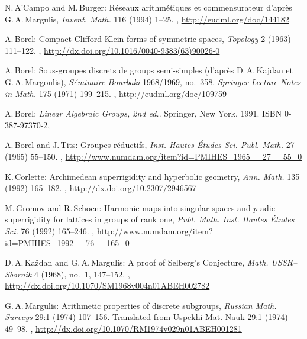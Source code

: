 \begin{references}{99}

 N.\,A'Campo and M.\,Burger:
 R\'eseaux arithm\'etiques et commensurateur d'apr\`es
G.\,A.\,Margulis,
 \emph{Invent. Math.} 116 (1994) 1--25.
 ,
  \maynewline 
 \url{http://eudml.org/doc/144182}

A.\,Borel:
Compact Clifford-Klein forms of symmetric spaces,
\emph{Topology} 2 (1963) 111--122.
,
\maynewline
\url{http://dx.doi.org/10.1016/0040-9383(63)90026-0}

A.\,Borel:
Sous-groupes discrets de groups semi-simples (d'apr\`es D.\,A.\,Kajdan et G.\,A.\,Margoulis),
\emph{S\'eminaire Bourbaki} 1968/1969, %
no.~358.
\emph{Springer Lecture Notes in Math.} 175 (1971) 199--215.
,
\maynewline
\url{http://eudml.org/doc/109759}

A.\,Borel:
\emph{Linear Algebraic Groups, 2nd ed.}.
Springer, New York, 1991.
ISBN 0-387-97370-2,

A.\,Borel and J.\,Tits:
Groupes r\'eductifs,
\emph{Inst. Hautes \'Etudes Sci. Publ. Math.} 27 (1965) 55--150.
,
\maynewline
\url{http://www.numdam.org/item?id=PMIHES_1965__27__55_0}

 K.\,Corlette:
 Archimedean superrigidity and hyperbolic geometry,
 \emph{Ann. Math.} 135 (1992) 165--182.
 ,
 \maynewline
 \url{http://dx.doi.org/10.2307/2946567}

 M.\,Gromov and R.\,Schoen:
 Harmonic maps into singular spaces and $p$-adic
superrigidity for lattices in groups of rank one,
 \emph{Publ. Math. Inst. Hautes \'Etudes Sci.} 76 (1992) 165--246.
,
\maynewline
\url{http://www.numdam.org/item?id=PMIHES_1992__76__165_0}

D.\,A.\,Ka\v zdan and G.\,A.\,Margulis:
A proof of Selberg's Conjecture,
\emph{Math. USSR--Sbornik} 4 (1968), no.~1, 147--152.
,
\maynewline
\url{http://dx.doi.org/10.1070/SM1968v004n01ABEH002782}

 G.\,A.\,Margulis: 
 Arithmetic properties of discrete subgroups, 
 \emph{Russian Math. Surveys} 29:1 (1974) 107--156.
Translated from Uspekhi Mat. Nauk 29:1 (1974) 49--98.
,
\maynewline
\url{http://dx.doi.org/10.1070/RM1974v029n01ABEH001281}


\end{references}
